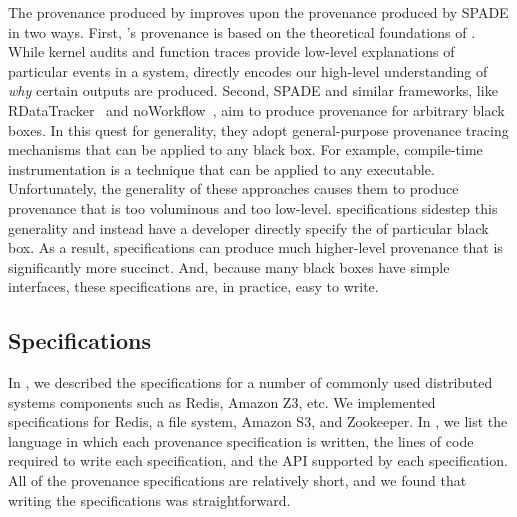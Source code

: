 The provenance produced by \fluent{} improves upon the provenance produced by
SPADE in two ways. First, \fluent{}'s provenance is based on the theoretical
foundations of \watprovenance{}. While kernel audits and function traces
provide low-level explanations of particular events in a system,
\watprovenance{} directly encodes our high-level understanding of \emph{why}
certain outputs are produced. Second, SPADE and similar frameworks, like
RDataTracker~\cite{lerner2014collecting} and
noWorkflow~\cite{murta2014noworkflow}, aim to produce provenance for arbitrary
black boxes. In this quest for generality, they adopt general-purpose
provenance tracing mechanisms that can be applied to any black box. For
example, compile-time instrumentation is a technique that can be applied to any
executable.  Unfortunately, the generality of these approaches causes them to
produce provenance that is too voluminous and too low-level. \Watprovenance{}
specifications sidestep this generality and instead have a developer directly
specify the \watprovenance{} of particular black box.  As a result,
\watprovenance{} specifications can produce much higher-level provenance that
is significantly more succinct.  And, because many black boxes have simple
interfaces, these \watprovenance{} specifications are, in practice, easy to
write.

{}

\subsection{\WatProvenance{} Specifications}
In , we described the \watprovenance{} specifications for
a number of commonly used distributed systems components such as Redis, Amazon
Z3, etc. We implemented \fluent{} \watprovenance{} specifications for Redis, a
file system, Amazon S3, and Zookeeper. In , we list the
language in which each provenance specification is written, the lines of code
required to write each specification, and the API supported by each
specification. All of the provenance specifications are relatively short, and
we found that writing the specifications was straightforward.

